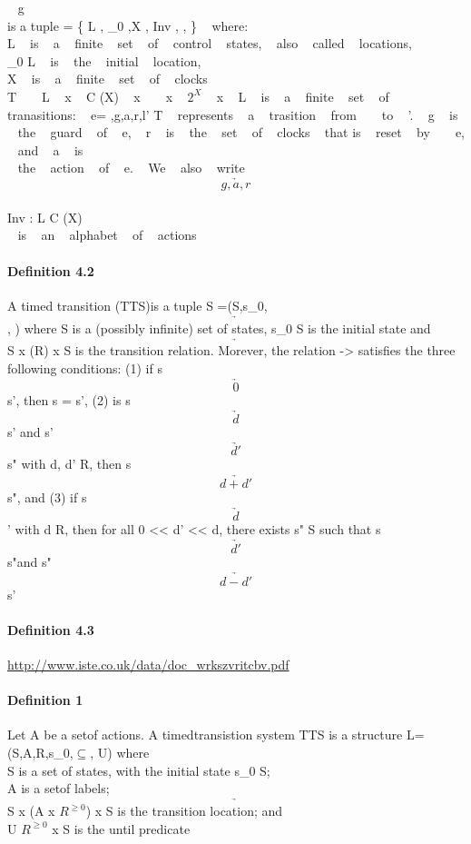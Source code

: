    \ell ~ \boldsymbol \ell  g \\
  
    is a tuple = \{ L ,  \ell_{0} ,X ,  Inv ,  , \Sigma \} ~ where: \\
 L ~  is ~   a  ~  finite ~   set  ~  of  ~  control ~   states, ~   also ~   called ~   locations, \\
 \ell_{0}    \in L  ~  is  ~  the ~   initial  ~  location,  ~  \\
 X   ~ is  ~  a ~   finite  ~  set  ~  of  ~  clocks \\
 T ~   \subseteq ~   L ~  x ~ C (X) ~  x  ~ \sigma  ~ x  ~ $2^{X}$ ~ x ~ L  ~ is  ~ a  ~ finite ~  set  ~ of ~  tranasitions: ~   e= \langle \ell ,g,a,r,l' \rangle  \in T ~  represents ~   a   ~ trasition  ~  from ~   \ell ~  to  ~  \ell'. ~  g  ~  is  ~  the   ~ guard   ~ of ~   e, ~   r  ~  is  ~  the  ~  set  ~  of  ~  clocks  ~  that  is ~   reset  ~  by ~    ~  e, \\ ~   and   ~   a ~   is \\  ~  the  ~  action  ~  of  ~  e.  ~  We ~   also ~   write  ~  \ell    $$\underrightarrow{g,a,r}  $$ \\
 Inv : L \to C (X) \\
 \Sigma  ~ is  ~ an  ~ alphabet  ~  of  ~  actions
\paragraph{Definition 4.2}
A timed transition (TTS)is a tuple S =(S,s_{0},$$\underrightarrow{} $$, \Sigma) where S is a (possibly infinite) set of states, s_{0} \in S is the initial state and $$\underrightarrow{} $$   \subseteq S x (\Sigma \cup R) x S is the transition relation. Morever, the relation -> satisfies the three following conditions:
(1)  if s $$\underrightarrow{0} $$ s', then s = s',  (2) is s$$\underrightarrow{d} $$ s' and s' $$\underrightarrow{d'} $$ s"  with d, d' \in R, then s $$\underrightarrow{d+d'} $$ s", and (3) if s $$\underrightarrow{d} $$ ' with d \in R, then for all 0 << d' << d, there exists s" \in S such that s $$\underrightarrow{d'} $$ s"and s" $$\underrightarrow{d-d'} $$ s'
\paragraph{Definition 4.3}

\url{http://www.iste.co.uk/data/doc_wrkszvritcbv.pdf}


\paragraph{Definition 1}
Let A be a setof actions. A timedtransistion system TTS is a structure L=(S,A,R,s_{0},$\subseteq$, U) where \\
S is a set of states, with the initial state s_{0} \in S; \\
A is a setof labels;\\
 $$\underrightarrow{}  $$ \subseteq S x (A x $R^{ \geq 0}$) x S is the transition location; and \\
U \subseteq  $R^{ \geq 0}$ x S is the until predicate \\



